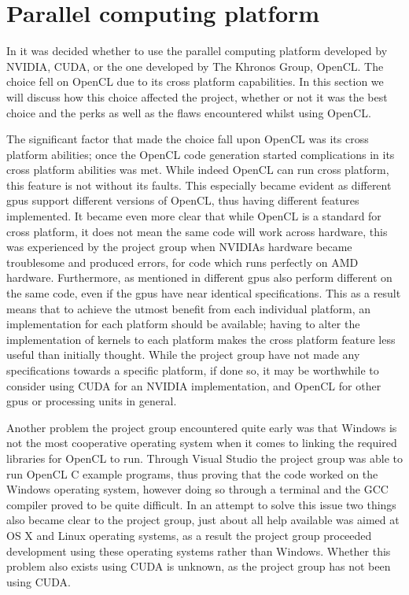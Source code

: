\section{Parallel computing platform}
In  it was decided whether to use the parallel computing platform developed by NVIDIA, CUDA, or the one developed by The Khronos Group, OpenCL.
The choice fell on OpenCL due to its cross platform capabilities.
In this section we will discuss how this choice affected the project, whether or not it was the best choice and the perks as well as the flaws encountered whilst using OpenCL.

The significant factor that made the choice fall upon OpenCL was its cross platform abilities; once the OpenCL code generation started complications in its cross platform abilities was met.
While indeed OpenCL can run cross platform, this feature is not without its faults.
This especially became evident as different \acrshort{gpu}s support different versions of OpenCL, thus having different features implemented.
It became even more clear that while OpenCL is a standard for cross platform, it does not mean the same code will work across hardware, this was experienced by the project group when NVIDIAs hardware became troublesome and produced errors, for code which runs perfectly on AMD hardware.
Furthermore, as mentioned in  different \acrshort{gpu}s also perform different on the same code, even if the \acrshort{gpu}s have near identical specifications.
This as a result means that to achieve the utmost benefit from each individual platform, an implementation for each platform should be available; having to alter the implementation of kernels to each platform makes the cross platform feature less useful than initially thought.
While the project group have not made any specifications towards a specific platform, if done so, it may be worthwhile to consider using CUDA for an NVIDIA implementation, and OpenCL for other \acrshort{gpu}s or processing units in general.

Another problem the project group encountered quite early was that Windows is not the most cooperative operating system when it comes to linking the required libraries for OpenCL to run.
Through Visual Studio the project group was able to run OpenCL C example programs, thus proving that the code worked on the Windows operating system, however doing so through a terminal and the GCC compiler proved to be quite difficult.
In an attempt to solve this issue two things also became clear to the project group, just about all help available was aimed at OS X and Linux operating systems, as a result the project group proceeded development using these operating systems rather than Windows.
Whether this problem also exists using CUDA is unknown, as the project group has not been using CUDA.
%

